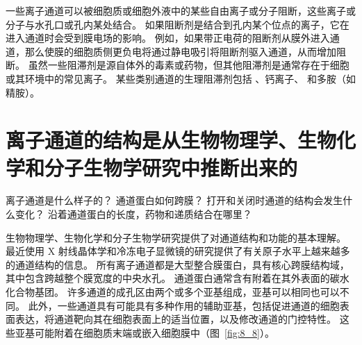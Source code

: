 一些离子通道可以被细胞质或细胞外液中的某些自由离子或分子阻断，这些离子或分子与水孔口或孔内某处结合。
如果阻断剂是结合到孔内某个位点的离子，它在进入通道时会受到膜电场的影响。
例如，如果带正电荷的阻断剂从膜外进入通道，那么使膜的细胞质侧更负电将通过静电吸引将阻断剂驱入通道，从而增加阻断。
虽然一些阻滞剂是源自体外的毒素或药物，但其他阻滞剂是通常存在于细胞或其环境中的常见离子。
某些类别通道的生理阻滞剂包括 、钙离子、 和多胺（如精胺）。



\section{离子通道的结构是从生物物理学、生物化学和分子生物学研究中推断出来的}

离子通道是什么样子的？
通道蛋白如何跨膜？
打开和关闭时通道的结构会发生什么变化？
沿着通道蛋白的长度，药物和递质结合在哪里？


生物物理学、生物化学和分子生物学研究提供了对通道结构和功能的基本理解。
最近使用 X 射线晶体学和冷冻电子显微镜的研究提供了有关原子水平上越来越多的通道结构的信息。
所有离子通道都是大型整合膜蛋白，具有核心跨膜结构域，其中包含跨越整个膜宽度的中央水孔。
通道蛋白通常含有附着在其外表面的碳水化合物基团。 许多通道的成孔区由两个或多个亚基组成，亚基可以相同也可以不同。
此外，一些通道具有可能具有多种作用的辅助亚基，包括促进通道的细胞表面表达，将通道靶向其在细胞表面上的适当位置，以及修改通道的门控特性。
这些亚基可能附着在细胞质末端或嵌入细胞膜中（图~\ref{fig:8_8}）。


